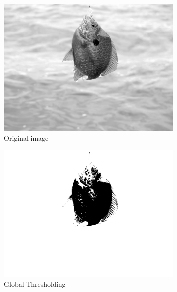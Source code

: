 \begin{figure}[H]
    \centering
    \begin{subfigure}{0.33\textwidth}
        \centering
        \includegraphics[width=.99\linewidth]{images/literature/thresholding/original_fish_grayscale}
        \caption{Original image\cite{website:colorfish_image}}
    \end{subfigure}%
    \begin{subfigure}{.33\textwidth}
        \centering
        \includegraphics[width=.99\linewidth]{images/literature/thresholding/fish_global_thresholding}
        \caption{Global Thresholding}
    \end{subfigure}%
    \begin{subfigure}{.33\textwidth}

\end{subfigure}
\end{figure}
